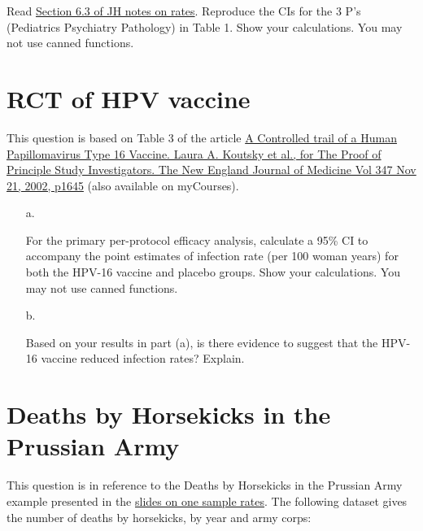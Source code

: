 \documentclass[letterpaper,9pt,twoside,printwatermark=false]{pinp}
\begin{document}
Read
\href{https://www.dropbox.com/s/b5q7vqo2ev6k2me/EPIB607intensity-model-inference-plan-2018.pdf?dl=0}{Section
6.3 of JH notes on rates}. Reproduce the CIs for the 3 P's (Pediatrics
Psychiatry Pathology) in Table 1. Show your calculations. You may not
use canned functions.

\section{RCT of HPV vaccine}\label{rct-of-hpv-vaccine}

This question is based on Table 3 of the article
\href{https://www.nejm.org/doi/pdf/10.1056/NEJMoa020586}{A Controlled
trail of a Human Papillomavirus Type 16 Vaccine. Laura A. Koutsky et
al., for The Proof of Principle Study Investigators. The New England
Journal of Medicine Vol 347 Nov 21, 2002, p1645} (also available on
myCourses).

\begin{enumerate}

\item[a.]

For the primary per-protocol efficacy analysis, calculate a 95\% CI to accompany the point estimates of infection rate (per 100 woman years) for both the HPV-16 vaccine and placebo groups. Show your calculations. You may not use canned functions. 


\item[b.] 

Based on your results in part (a), is there evidence to suggest that the HPV-16 vaccine reduced infection rates? Explain. 










\end{enumerate}

\newpage

\section{Deaths by Horsekicks in the Prussian
Army}\label{deaths-by-horsekicks-in-the-prussian-army}

This question is in reference to the Deaths by Horsekicks in the
Prussian Army example presented in the
\href{https://github.com/sahirbhatnagar/EPIB607/raw/master/slides/one_sample_rate/EPIB607_one_sample_rate.pdf}{slides
on one sample rates}. The following dataset gives the number of deaths
by horsekicks, by year and army corps:
\end{document}
